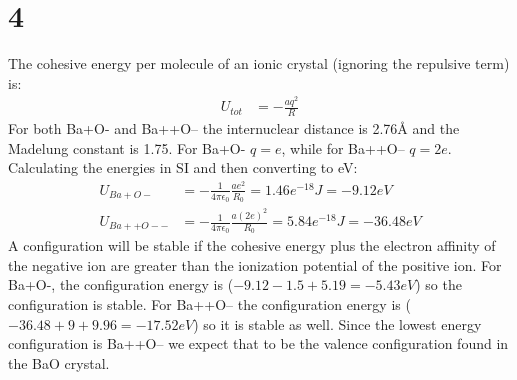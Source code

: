 \documentclass[a4paper,11pt]{article}
\numberwithin{equation}{section}
\newcommand{\ez}{\epsilon_0}
\begin{document}
\section*{4}
The cohesive energy per molecule of an ionic crystal (ignoring the repulsive term) is:
\begin{align}
 U_{tot} &= -\frac{aq^2}{R}
\end{align}
For both Ba+O- and Ba++O-- the internuclear distance is 2.76\AA{} and the Madelung constant is 1.75.
For Ba+O- $q=e$, while for Ba++O-- $q=2e$. 
Calculating the energies in SI and then converting to eV:
\begin{align}
 U_{Ba+O-} &= -\frac{1}{4\pi\ez}\frac{ae^2}{R_0} = 1.46e^{-18} J = -9.12 eV\\
 U_{Ba++O--} &= -\frac{1}{4\pi\ez}\frac{a(2e)^2}{R_0} = 5.84e^{-18} J = -36.48 eV
\end{align}
A configuration will be stable if the cohesive energy plus the electron affinity of the negative ion are greater than the ionization potential of the positive ion.
For Ba+O-, the configuration energy is ($-9.12-1.5+5.19=-5.43 eV$) so the configuration is stable.
For Ba++O-- the configuration energy is ($-36.48+9+9.96=-17.52 eV$) so it is stable as well.
Since the lowest energy configuration is Ba++O-- we expect that to be the valence configuration found in the BaO crystal.
\end{document}
